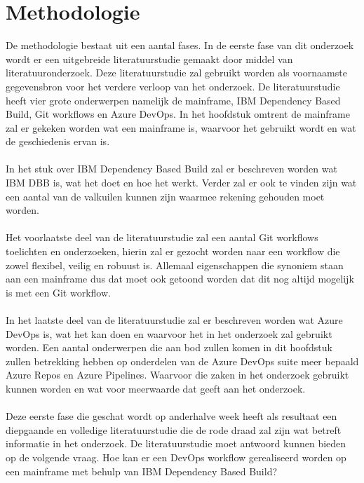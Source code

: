 \section{Methodologie}%
\label{sec:methodologie}

De methodologie bestaat uit een aantal fases.
In de eerste fase van dit onderzoek wordt er een uitgebreide literatuurstudie gemaakt door middel van literatuuronderzoek.
Deze literatuurstudie zal gebruikt worden als voornaamste gegevensbron voor het verdere verloop van het onderzoek.
De literatuurstudie heeft vier grote onderwerpen namelijk de mainframe, IBM Dependency Based Build, Git workflows en Azure DevOps.
In het hoofdstuk omtrent de mainframe zal er gekeken worden wat een mainframe is, waarvoor het gebruikt wordt en wat de geschiedenis ervan is.
\\ \\
In het stuk over IBM Dependency Based Build zal er beschreven worden wat IBM DBB is, wat het doet en hoe het werkt.
Verder zal er ook te vinden zijn wat een aantal van de valkuilen kunnen zijn waarmee rekening gehouden moet worden.
\\ \\
Het voorlaatste deel van de literatuurstudie zal een aantal Git workflows toelichten en onderzoeken, hierin zal er gezocht worden naar een workflow die zowel flexibel, veilig en robuust is.
Allemaal eigenschappen die synoniem staan aan een mainframe dus dat moet ook getoond worden dat dit nog altijd mogelijk is met een Git workflow.
\\ \\
In het laatste deel van de literatuurstudie zal er beschreven worden wat Azure DevOps is, wat het kan doen en waarvoor het in het onderzoek zal gebruikt worden.
Een aantal onderwerpen die aan bod zullen komen in dit hoofdstuk zullen betrekking hebben op onderdelen van de Azure DevOps suite meer bepaald Azure Repos en Azure Pipelines.
Waarvoor die zaken in het onderzoek gebruikt kunnen worden en wat voor meerwaarde dat geeft aan het onderzoek.
\\ \\
Deze eerste fase die geschat wordt op anderhalve week heeft als resultaat een diepgaande en volledige literatuurstudie die de rode draad zal zijn wat betreft informatie in het onderzoek. De literatuurstudie moet antwoord kunnen bieden op de volgende vraag. Hoe kan er een DevOps workflow gerealiseerd worden op een mainframe met behulp van IBM Dependency Based Build?
